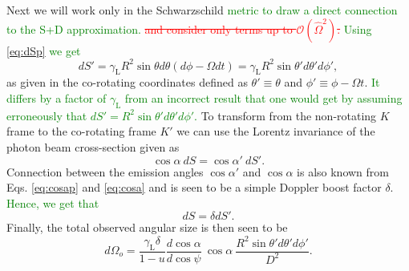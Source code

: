 \documentclass{aa}
\newcommand{\be}{\begin{equation}}
\newcommand{\ee}{\end{equation}}
\newcommand{\refe}[1]{\textcolor{green}{{#1}}}
\newcommand{\refedel}[1]{\textcolor{red}{\sout{#1}}}
\newcommand{\sch}{Schwarzschild }
\newcommand{\Ob}{\ensuremath{\hat{\Omega}}}
\newcommand{\lgamma}{\gamma_{\text{L}}}
\begin{document}
Next we will work only in the \sch \refe{metric to draw a direct connection to the S+D approximation.} \refedel{and consider only terms up to $\mathcal{O}(\Ob^2)$.}
\refe{Using \eqref{eq:dSp} we get}
\be\label{eq:dS_subs}
dS' = \lgamma R^2 \sin\theta d\theta (d\phi - \Omega dt) = \lgamma R^2 \sin\theta' d\theta' d\phi',
\ee
as given in the co-rotating coordinates defined as $\theta' \equiv \theta$ and $\phi' \equiv \phi - \Omega t$.
\refe{It differs by a factor of $\lgamma$ from an incorrect result that one would get by assuming erroneously that $dS' = R^2 \sin\theta' d\theta' d\phi'$.}
To transform from the non-rotating $K$ frame to the co-rotating frame $K'$ we can use the Lorentz invariance of the photon beam cross-section given as \citep{Terrell60, LB85}
\be
\cos\alpha ~dS = \cos\alpha' ~dS'.
\ee
Connection between the emission angles $\cos\alpha'$ and $\cos\alpha$ is also known from Eqs. \eqref{eq:cosap} and \eqref{eq:cosa} and is seen to be a simple Doppler boost factor $\delta$.
\refe{Hence, we get that}
\be\label{eq:dSisdSp}
dS = \delta dS'.
\ee
Finally, the total observed angular size is then seen to be 
\be
d\Omega_o = \frac{\lgamma \delta}{1-u} \frac{d \cos\alpha}{d \cos\psi} ~\cos\alpha ~ \frac{R^2 \sin\theta' d\theta' d\phi'}{D^2}.
\ee
\end{document}
